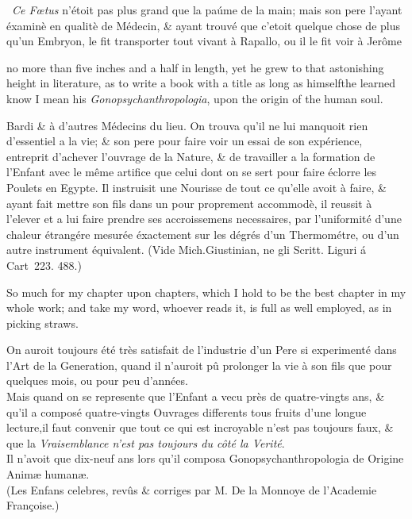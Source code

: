 \documentclass{article}
\begin{document}
\bgroup\footnotesize
\indent\fnast\ \textit{Ce Fœtus} n’étoit pas plus
grand que la paúme de la main; mais son pere l’ayant éxaminè
en qua\-litè de Médecin, \& ayant trouvé que c’etoit quelque
chose de plus qu’un Embryon, le fit transporter tout vivant
à Rapallo, ou il le fit voir à Jerôme\break
{}\par\egroup

\newpage\noindent
no more than five inches and a half in length, yet he grew
to that astonishing height in literature, as to write a book
with a title as long as himself\tsk the learned know I mean
his \textit{Gono\-psych\-an\-thropo\-logia}, upon the origin
of the human soul.\hfill\break{}


\vfill
\bgroup\footnotesize
\noindent
Bardi \& à d’autres
Médecins du lieu.  On trouva qu’il ne lui manquoit rien
d’essentiel a la vie; \& son pere pour faire voir un essai
de son expérience, entreprit d’achever l’ouvrage de la
Nature, \& de travailler a la formation de l’Enfant avec le
même artifice que celui dont on se sert pour faire éclorre
les Poulets en Egypte. Il instruisit une Nourisse de tout ce
qu’elle avoit à faire, \& ayant fait mettre son fils dans un
pour proprement accommodè, il reussit à l’elever et a lui
faire prendre ses accroissemens necessaires, par
l’uniformité d’une chaleur étrangére mesurée éxactement sur
les dégrés d’un Thermométre, ou d’un autre instrument
équivalent. (Vide Mich.\@  Giustinian, ne gli Scritt.\@
Liguri á
Cart~223. 488.)\hfill\break{}\par\egroup
\newpage
So much for my chapter upon chapters, which I hold
to be the best chapter in my whole work; and take my word, whoever
reads it, is full as well employed, as in picking straws.

\vfill


\vfill

\bgroup\footnotesize
On auroit toujours été très satisfait de l’industrie d’un Pere si
experimenté dans l’Art de la Generation, quand il n’auroit pû
prolonger la vie à son fils que pour quelques mois, ou pour peu
d’années.\\
\indent
Mais quand on se represente que l’Enfant a vecu près de quatre-vingts
ans, \& qu’il a composé quatre-vingts Ouvrages differents tous fruits
d’une longue lecture,\tsk il faut convenir que tout ce qui est
incroyable n’est pas toujours faux, \& que la \textit{Vraisemblance
n’est pas toujours du côté la Verité}.\\
\indent
Il n’avoit que dix-neuf ans lors qu’il composa
Gonopsychanthropologia de Origine Animæ humanæ.\\
\indent
(Les Enfans celebres, revûs \& corriges par M. De la Monnoye de
l’Academie Françoise.)\par\egroup
\end{document}
